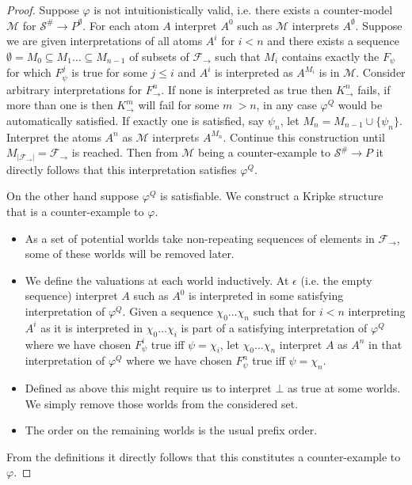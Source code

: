 \documentclass[a4paper,12pt]{report}
\theoremstyle{definition}
\theoremstyle{definition}
\theoremstyle{definition}
\theoremstyle{definition}
\theoremstyle{definition}
\theoremstyle{definition}
\theoremstyle{definition}
\begin{document}
	\begin{proof}
		Suppose $\varphi$ is not intuitionistically valid, i.e. there exists a counter-model $\mathcal M$ for $\mathcal S^\#\to P^\emptyset$. For each atom $A$ interpret $A^0$ such as $\mathcal M$ interprets $A^\emptyset$. Suppose we are given interpretations of all atoms $A^i$ for $i < n$ and there exists a sequence $\emptyset = M_0\subseteq M_1\dots\subseteq M_{n-1}$ of subsets of $\mathcal F_\to$ such that $M_i$ contains exactly the $F_\psi$ for which $F_\psi^j$ is true for some $j\leq i$ and $A^i$ is interpreted as $A^{M_i}$ is in $\mathcal M$. Consider arbitrary interpretations for $F_\to^{n}$. If none is interpreted as true then $K^n_\to$ fails, if more than one is then $K^m_\to$ will fail for some $m\ > n$, in any case $\varphi^Q$ would be automatically satisfied. If exactly one is satisfied, say $\psi_n$, let $M_n = M_{n-1}\cup\{\psi_n\}$. Interpret the atoms $A^n$ as $\mathcal M$ interprets $A^{M_n}$. Continue this construction until $M_{|\mathcal F_\to|}  = \mathcal F_\to$ is reached. Then from $\mathcal M$ being a counter-example to $\mathcal S^\#\to P$ it directly follows that this interpretation satisfies $\varphi^Q$.
		
		On the other hand suppose $\varphi^Q$ is satisfiable. We construct a Kripke structure that is a counter-example to $\varphi$.
		\begin{itemize}
			\item As a set of potential worlds take non-repeating sequences of elements in $\mathcal F_\to$, some of these worlds will be removed later.
			\item We define the valuations at each world inductively. At $\epsilon$ (i.e. the empty sequence) interpret $A$ such as $A^0$ is interpreted in some satisfying interpretation of $\varphi^Q$. Given a sequence $\chi_0\dots \chi_n$ such that for $i<n$ interpreting $A^i$ as it is interpreted in $\chi_0\dots\chi_i$ is part of a satisfying interpretation of $\varphi^Q$ where we have chosen $F^i_\psi$ true iff $\psi = \chi_i$, let $\chi_0\dots \chi_n$ interpret $A$ as $A^n$ in that interpretation of $\varphi^Q$ where we have chosen $F^n_\psi$ true iff $\psi = \chi_n$.
			\item Defined as above this might require us to interpret $\bot$ as true at some worlds. We simply remove those worlds from the considered set.
			\item The order on the remaining worlds is the usual prefix order.
		\end{itemize}
		From the definitions it directly follows that this constitutes a counter-example to $\varphi$.
	\end{proof}
\end{document}
